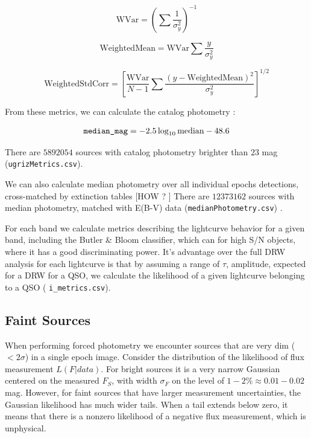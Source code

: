 \documentclass[fleqn,usenatbib]{mnras}  %
\begin{document}
\begin{equation}
\mbox{WVar} = \left( \sum{\frac{1}{\sigma_{y}^{2}}} \right) ^{-1}
\end{equation} 

\begin{equation}
\mbox{WeightedMean} = \mbox{WVar} \sum{\frac{y}{\sigma_{y}^{2}}}
\end{equation}

\begin{equation}
\mbox{WeightedStdCorr} =  \left[ \frac{ \mbox{WVar}  }{N-1} \sum{\frac{(y-\mbox{WeightedMean})^{2}}{\sigma_{y}^{2}}} \right] ^{1/2}
\end{equation}



From these metrics, we can calculate the catalog photometry  :

\begin{equation}
\verb|median_mag| = -2.5 \log_{10}\mbox{median} - 48.6
\end{equation}

There are  $5892054$ sources with catalog photometry brighter than $23$ mag  (\verb|ugrizMetrics.csv|). 

We can also calculate median photometry over all individual epochs  detections, cross-matched by extinction tables [HOW ? ]  There are $12373162$ sources with median photometry, matched with E(B-V) data (\verb|medianPhotometry.csv|) . 

For each band we calculate metrics describing the lightcurve behavior for a given band, including the Butler \& Bloom classifier, which can  for high S/N objects, where it has a good discriminating power. It's advantage over the full DRW analysis for each lightcurve is that by assuming a range of $\tau$, amplitude, expected for a DRW for a QSO, we calculate the likelihood of a given lightcurve belonging to a QSO ( \verb|i_metrics.csv|). 


\subsection{Faint Sources}
\label{sec:faint_sources}
When performing forced photometry we encounter sources that are very dim ($<2\sigma$) in a single epoch image.  Consider the distribution of the likelihood of flux measurement   $L(F|data)$. For bright sources it is a very narrow Gaussian centered on the measured $F_{S}$, with width $\sigma_{F}$ on the level of $1-2 \%  \approx 0.01-0.02$ mag. However, for faint sources that have larger measurement uncertainties, the Gaussian likelihood has much wider tails. When a tail extends below zero, it  means that there is a nonzero likelihood of a negative flux measurement, which is unphysical.
\end{document}
